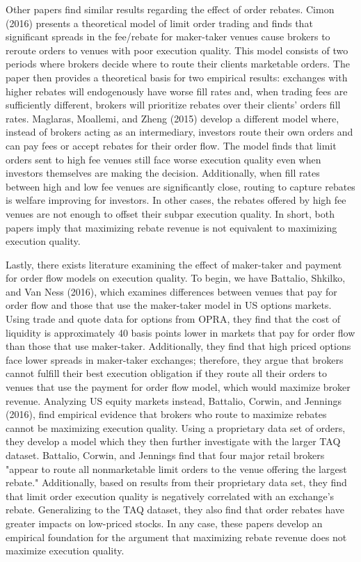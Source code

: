 \documentclass[11pt,a4paper]{article}
\begin{document}
Other papers find similar results regarding the effect of order rebates. Cimon (2016) presents a theoretical model of limit order trading and finds that significant spreads in the fee/rebate for maker-taker venues cause brokers to reroute orders to venues with poor execution quality. This model consists of two periods where brokers decide where to route their clients marketable orders. The paper then provides a theoretical basis for two empirical results: exchanges with higher rebates will endogenously have worse fill rates and, when trading fees are sufficiently different, brokers will prioritize rebates over their clients' orders fill rates. Maglaras, Moallemi, and Zheng (2015) develop a different model where, instead of brokers acting as an intermediary, investors route their own orders and can pay fees or accept rebates for their order flow. The model finds that limit orders sent to high fee venues still face worse execution quality even when investors themselves are making the decision. Additionally, when fill rates between high and low fee venues are significantly close, routing to capture rebates is welfare improving for investors. In other cases, the rebates offered by high fee venues are not enough to offset their subpar execution quality. In short, both papers imply that maximizing rebate revenue is not equivalent to maximizing execution quality. 

Lastly, there exists literature examining the effect of maker-taker and payment for order flow models on execution quality. To begin, we have Battalio, Shkilko, and Van Ness (2016), which examines differences between venues that pay for order flow and those that use the maker-taker model in US options markets. Using trade and quote data for options from OPRA, they find that the cost of liquidity is approximately 40 basis points lower in markets that pay for order flow than those that use maker-taker. Additionally, they find that high priced options face lower spreads in maker-taker exchanges; therefore, they argue that brokers cannot fulfill their best execution obligation if they route all their orders to venues that use the payment for order flow model, which would maximize broker revenue. Analyzing US equity markets instead, Battalio, Corwin, and Jennings (2016), find empirical evidence that brokers who route to maximize rebates cannot be maximizing execution quality. Using a proprietary data set of orders, they develop a model which they then further investigate with the larger TAQ dataset. Battalio, Corwin, and Jennings find that four major retail brokers "appear to route all nonmarketable limit orders to the venue offering the largest rebate." Additionally, based on results from their proprietary data set, they find that limit order execution quality is negatively correlated with an exchange's rebate. Generalizing to the TAQ dataset, they also find that order rebates have greater impacts on low-priced stocks. In any case, these papers develop an empirical foundation for the argument that maximizing rebate revenue does not maximize execution quality. 
\end{document}
